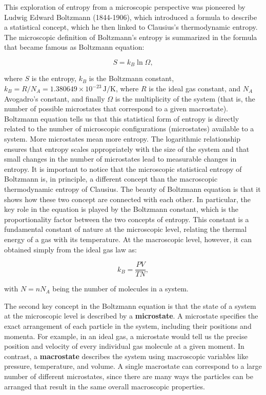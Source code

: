 \documentclass[
  9pt,
]{extbook}
\theoremstyle{definition}
\theoremstyle{definition}
\theoremstyle{definition}
\theoremstyle{definition}
\theoremstyle{remark}
\begin{document}
This exploration of entropy from a microscopic perspective was pioneered by Ludwig Edward Boltzmann (1844-1906), which introduced a formula to describe a statistical concept, which he then linked to Clausius's thermodynamic entropy. The microscopic definition of Boltzmann's entropy is summarized in the formula that became famous as Boltzmann equation:

\begin{equation}
S = k_B \ln \Omega,
\label{eq:boltzmanneq}
\end{equation}

where \(S\) is the entropy, \(k_B\) is the Boltzmann constant, \(k_B = R/N_A = 1.380649 \times 10^{-23} \, \text{J/K}\), where \(R\) is the ideal gas constant, and \(N_A\) Avogadro's constant, and finally \(\Omega\) is the multiplicity of the system (that is, the number of possible microstates that correspond to a given macrostate). Boltzmann equation tells us that this statistical form of entropy is directly related to the number of microscopic configurations (microstates) available to a system. More microstates mean more entropy. The logarithmic relationship ensures that entropy scales appropriately with the size of the system and that small changes in the number of microstates lead to measurable changes in entropy. It is important to notice that the microscopic statistical entropy of Boltzmann is, in principle, a different concept than the macroscopic thermodynamic entropy of Clausius. The beauty of Boltzmann equation is that it shows how these two concept are connected with each other. In particular, the key role in the equation is played by the Boltzmann constant, which is the proportionality factor between the two concepts of entropy. This constant is a fundamental constant of nature at the microscopic level, relating the thermal energy of a gas with its temperature. At the macroscopic level, however, it can obtained simply from the ideal gas law as:

\begin{equation}
k_B = \frac{PV}{TN},
\label{eq:stat2}
\end{equation}

with \(N=nN_A\) being the number of molecules in a system.

The second key concept in the Boltzmann equation is that the state of a system at the microscopic level is described by a \textbf{microstate}. A microstate specifies the exact arrangement of each particle in the system, including their positions and momenta. For example, in an ideal gas, a microstate would tell us the precise position and velocity of every individual gas molecule at a given moment. In contrast, a \textbf{macrostate} describes the system using macroscopic variables like pressure, temperature, and volume. A single macrostate can correspond to a large number of different microstates, since there are many ways the particles can be arranged that result in the same overall macroscopic properties.
\end{document}
